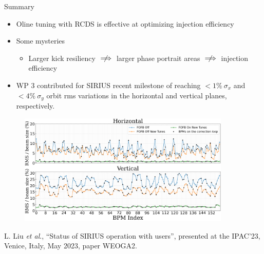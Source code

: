 \documentclass[aspectratio=169]{beamer}
\begin{document}
\begin{frame}{Summary}
    \begin{itemize}
    \item Oline tuning with RCDS is effective at optimizing injection efficiency
    \item Some mysteries
    \begin{itemize}
        \item Larger kick resiliency $\centernot\implies$ larger phase portrait areas $\centernot\implies$ injection efficiency
    \end{itemize}
    \pause
    \item WP 3 contributed for SIRIUS recent milestone of reaching $<1\%~\sigma_x$ and $<4\%~\sigma _y$ orbit rms variations in the horizontal and vertical planes, respectively.\\
    \end{itemize}
    \begin{minipage}{0.7\textwidth}
        \begin{figure}
            \centering
            \includegraphics[width=0.9\textwidth]{WEOGA2_f5.png}
        \end{figure}
    \end{minipage}
    \hfill
    \begin{minipage}{0.29\textwidth}
        \scriptsize
        L. Liu \emph{et al}., “Status of SIRIUS operation with users”,
    presented at the IPAC’23, Venice, Italy, May 2023, paper
    WEOGA2.

    \end{minipage}
\end{frame}
\end{document}
